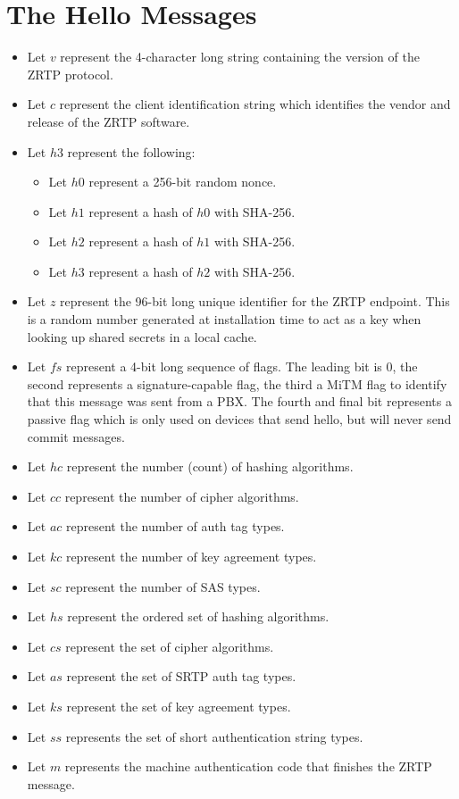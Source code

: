 \documentclass[11pt]{article}
\begin{document}
  \section{The Hello Messages}
  \begin{itemize}
    \item Let $v$ represent the 4-character long string containing 
          the version of the ZRTP protocol.
    \item Let $c$ represent the client identification string which
          identifies the vendor and release of the ZRTP software.
    \item Let $h3$ represent the following:
       \begin{itemize}
       \item Let $h0$ represent a 256-bit random nonce.
       \item Let $h1$ represent a hash of $h0$ with SHA-256.
       \item Let $h2$ represent a hash of $h1$ with SHA-256.
       \item Let $h3$ represent a hash of $h2$ with SHA-256.
       \end{itemize}
    \item Let $z$ represent the 96-bit long unique identifier for 
          the ZRTP endpoint. This is a random number generated at 
          installation time to act as a key when looking up 
          shared secrets in a local cache.
    \item Let $fs$ represent a 4-bit long sequence of flags. 
          The leading bit is 0, the second represents a 
          signature-capable flag, the third a MiTM flag to 
          identify that this message was sent from a PBX. The 
          fourth and final bit represents a passive flag 
          which is only used on devices that send hello, 
          but will never send commit messages.
    \item Let $hc$ represent the number (count) of hashing 
            algorithms.
    \item Let $cc$ represent the number of cipher algorithms.
    \item Let $ac$ represent the number of auth tag types.
    \item Let $kc$ represent the number of key agreement types.
    \item Let $sc$ represent the number of SAS types.
    \item Let $hs$ represent the ordered set of hashing algorithms.
    \item Let $cs$ represent the set of cipher algorithms.
    \item Let $as$ represent the set of SRTP auth tag types.
    \item Let $ks$ represent the set of key agreement types.
    \item Let $ss$ represents the set of short authentication 
          string types.
    \item Let $m$ represents the machine authentication code 
          that finishes the ZRTP message.
  \end{itemize}
\end{document}
